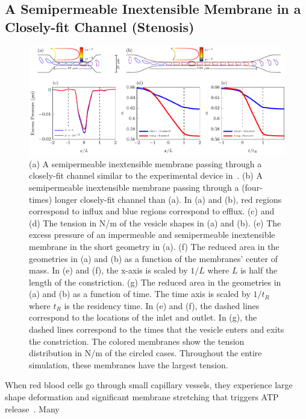\documentclass[prb,preprint,showpacs,preprintnumbers,amsmath,amssymb,longbibliography]{revtex4-1}
\newif\ifTikz
\begin{document}
\subsection{A Semipermeable Inextensible Membrane in a Closely-fit Channel (Stenosis)}
\begin{figure}[htp]
  \centering
  \ifTikz
  
  \else
  \includegraphics{figures/stenosisComposite.pdf}
  \fi
  \caption{\label{fig:stenosisComposite} (a) A semipermeable inextensible membrane
  passing through a closely-fit channel similar to the experimental
  device in~\citet{abk-fai-sto2006}. (b) A semipermeable inextensible membrane passing
  through a (four-times) longer closely-fit channel than (a). In (a) and
  (b), red regions correspond to influx and blue regions correspond to
  efflux. (c) and (d) The tension in N/m of the vesicle shapes in (a)
  and (b). (e) The excess pressure of an impermeable and semipermeable
  inextensible membrane in the short geometry in (a). (f) The reduced area in the geometries in (a) and (b) as a function
  of the membranes' center of mass. In (e) and (f), the x-axis is scaled
  by $1/L$ where $L$ is half the length of the constriction. (g) The
  reduced area in the geometries in (a)
  and (b) as a function of time. The time axis is scaled by $1/t_R$
  where $t_R$ is the residency time. In (e) and (f), the dashed lines
  correspond to the locations of the inlet and outlet. In (g), the
  dashed lines correspond to the times that the vesicle enters and exits
  the constriction. The colored membranes show the tension distribution
  in N/m of the circled cases. Throughout the entire simulation,
  these membranes have the largest tension.}
\end{figure}
When red blood cells go through small capillary vessels, they experience
large shape deformation and significant membrane stretching that
triggers ATP release~\cite{Wan2008_PNAS, ForsythWan2011_PNAS}. Many
\end{document}
